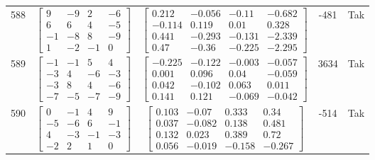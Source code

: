 \documentclass[a4paper,12pt]{article}
\begin{document}
\begin{tabular}{c c c c c}
588
&
$\begin{bmatrix} 9 & -9 & 2 & -6 \\ 6 & 6 & 4 & -5 \\ -1 & -8 & 8 & -9 \\ 1 & -2 & -1 & 0 \end{bmatrix}$
&
$\begin{bmatrix} 0.212 & -0.056 & -0.11 & -0.682 \\ -0.114 & 0.119 & 0.01 & 0.328 \\ 0.441 & -0.293 & -0.131 & -2.339 \\ 0.47 & -0.36 & -0.225 & -2.295 \end{bmatrix}$
&
-481
&
Tak
\\
589
&
$\begin{bmatrix} -1 & -1 & 5 & 4 \\ -3 & 4 & -6 & -3 \\ -3 & 8 & 4 & -6 \\ -7 & -5 & -7 & -9 \end{bmatrix}$
&
$\begin{bmatrix} -0.225 & -0.122 & -0.003 & -0.057 \\ 0.001 & 0.096 & 0.04 & -0.059 \\ 0.042 & -0.102 & 0.063 & 0.011 \\ 0.141 & 0.121 & -0.069 & -0.042 \end{bmatrix}$
&
3634
&
Tak
\\
590
&
$\begin{bmatrix} 0 & -1 & 4 & 9 \\ -5 & -6 & 6 & -1 \\ 4 & -3 & -1 & -3 \\ -2 & 2 & 1 & 0 \end{bmatrix}$
&
$\begin{bmatrix} 0.103 & -0.07 & 0.333 & 0.34 \\ 0.037 & -0.082 & 0.138 & 0.481 \\ 0.132 & 0.023 & 0.389 & 0.72 \\ 0.056 & -0.019 & -0.158 & -0.267 \end{bmatrix}$
&
-514
&
Tak
\\
\end{tabular} \egroup \newpage
\end{document}
